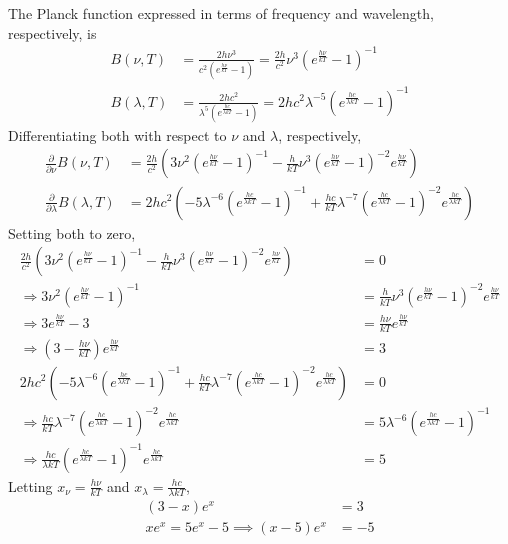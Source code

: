 \documentclass{article}
\begin{document}
The Planck function expressed in terms of frequency and wavelength, respectively, is
\begin{align}
    B(\nu, T) &= \frac{2h \nu^3}{c^2 (e^{\frac{h \nu}{k T}} - 1)} = \frac{2h}{c^2} \nu^3 (e^{\frac{h \nu}{kT}} - 1)^{-1} \\
    B(\lambda, T) &= \frac{2h c^2}{\lambda^5 (e^{\frac{h c}{\lambda k T}} - 1)} = 2hc^2 \lambda^{-5} (e^{\frac{h c}{\lambda k T}} - 1)^{-1}
\end{align}
Differentiating both with respect to \(\nu\) and \(\lambda\), respectively,
\begin{align}
    \frac{\partial}{\partial \nu} B(\nu, T) &= \frac{2h}{c^2} \left(3\nu^2 (e^{\frac{h \nu}{kT}} - 1)^{-1} - \frac{h}{k T} \nu^3 (e^{\frac{h \nu}{k T}} - 1)^{-2} e^{\frac{h \nu}{k T}}\right) \\
    \frac{\partial}{\partial \lambda} B(\lambda, T) &= 2hc^2 \left(-5\lambda^{-6} (e^{\frac{h c}{\lambda k T}} - 1)^{-1} + \frac{h c}{k T}\lambda^{-7} (e^{\frac{h c}{\lambda k T}} - 1)^{-2} e^{\frac{h c}{\lambda k T}}\right)
\end{align}
Setting both to zero,
\begin{align}
    \frac{2h}{c^2} \left(3\nu^2 (e^{\frac{h \nu}{kT}} - 1)^{-1} - \frac{h}{k T} \nu^3 (e^{\frac{h \nu}{k T}} - 1)^{-2}e^{\frac{h \nu}{k T}}\right) &= 0 \\
    \Rightarrow 3\nu^2 (e^{\frac{h \nu}{kT}} - 1)^{-1} &= \frac{h}{k T} \nu^3 (e^{\frac{h \nu}{k T}} - 1)^{-2}e^{\frac{h \nu}{k T}} \\
    \Rightarrow 3e^{\frac{h \nu}{k T}} - 3 &= \frac{h \nu}{k T} e^{\frac{h \nu}{k T}} \\
    \Rightarrow \left(3 - \frac{h \nu}{k T}\right) e^{\frac{h \nu}{k T}} &= 3 \\
    2hc^2 \left(-5\lambda^{-6} (e^{\frac{h c}{\lambda k T}} - 1)^{-1} + \frac{h c}{k T}\lambda^{-7} (e^{\frac{h c}{\lambda k T}} - 1)^{-2} e^{\frac{h c}{\lambda k T}}\right) &= 0 \\
    \Rightarrow \frac{h c}{k T}\lambda^{-7} (e^{\frac{h c}{\lambda k T}} - 1)^{-2} e^{\frac{h c}{\lambda k T}} &= 5\lambda^{-6} (e^{\frac{h c}{\lambda k T}} - 1)^{-1} \\
    \Rightarrow \frac{h c}{\lambda k T} (e^{\frac{h c}{\lambda k T}} - 1)^{-1} e^{\frac{h c}{\lambda k T}} &= 5
\end{align}
Letting \(x_\nu = \frac{h \nu}{k T}\) and \(x_\lambda = \frac{h c}{\lambda k T}\),
\begin{align}
    (3 - x) e^x &= 3 \\
    x e^x = 5e^x - 5 \implies (x - 5)e^x &= -5 \\
\end{align}
\end{document}
